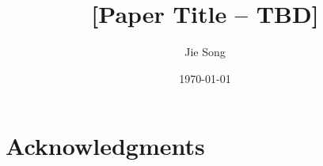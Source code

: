 \documentclass[11pt]{article}
\title{[Paper Title -- TBD]}
\author{Jie Song}
\date{\today}
\begin{document}
\maketitle

\begin{abstract}
\end{abstract}









\section*{Acknowledgments}




\appendix

\end{document}
